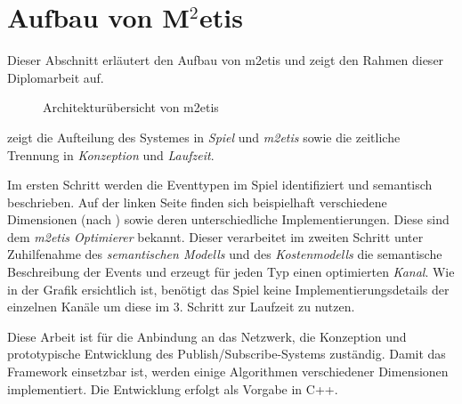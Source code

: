 \section{Aufbau von M$^2$etis}
\label{chap:grundlagen:aufbau_metis}

Dieser Abschnitt erläutert den Aufbau von \ac{m2etis} \cite{Fischer2010a, Fischer2010Event} und zeigt den Rahmen dieser Diplomarbeit auf. 

\begin{figure}[htbp]
\centering
{}
\caption{Architekturübersicht von \ac{m2etis}}
\label{fig:metis_aufbau}
\end{figure}

 zeigt die Aufteilung des Systemes in \emph{Spiel} und \emph{\ac{m2etis}} sowie die zeitliche Trennung in \emph{Konzeption} und \emph{Laufzeit}.

Im ersten Schritt werden die Eventtypen im Spiel identifiziert und semantisch beschrieben. Auf der linken Seite finden sich beispielhaft verschiedene Dimensionen (nach \cite{Fischer2010a}) sowie deren unterschiedliche Implementierungen. Diese sind dem \emph{\ac{m2etis} Optimierer} bekannt. Dieser verarbeitet im zweiten Schritt unter Zuhilfenahme des \emph{semantischen Modells} und des \emph{Kostenmodells} die semantische Beschreibung der Events und erzeugt für jeden Typ einen optimierten \emph{Kanal}. Wie in der Grafik ersichtlich ist, benötigt das Spiel keine  Implementierungsdetails der einzelnen Kanäle um diese im 3. Schritt zur Laufzeit zu nutzen.

Diese Arbeit ist für die Anbindung an das Netzwerk, die Konzeption und prototypische Entwicklung des Publish/Subscribe-Systems zuständig. Damit das Framework einsetzbar ist, werden einige Algorithmen verschiedener Dimensionen implementiert. Die Entwicklung erfolgt als Vorgabe in C++.
